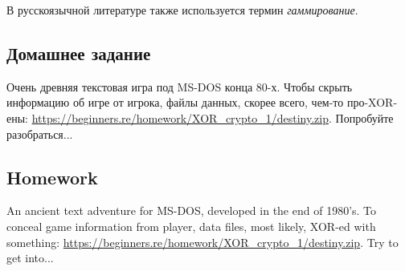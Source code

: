 ﻿
\label{simple_XOR_encryption}

\ifdefined\RUSSIAN
В русскоязычной литературе также используется термин \emph{гаммирование}.
\fi

\EN{}
\FR{}
\DE{}

\EN{}
\RU{}
\FR{}

\EN{}
\RU{}
\FR{}

\EN{}
\RU{}
\FR{}

\EN{}
\RU{}
\FR{}

\ifdefined\RUSSIAN
\subsection{Домашнее задание}

Очень древняя текстовая игра под MS-DOS конца 80-х.
Чтобы скрыть информацию об игре от игрока, файлы данных, скорее всего, чем-то про-XOR-ены:
\url{https://beginners.re/homework/XOR_crypto_1/destiny.zip}.
Попробуйте разобраться...
\fi

\ifdefined\ENGLISH
\subsection{Homework}

An ancient text adventure for MS-DOS, developed in the end of 1980's.
To conceal game information from player, data files, most likely, XOR-ed with something:
\url{https://beginners.re/homework/XOR_crypto_1/destiny.zip}.
Try to get into...
\fi

